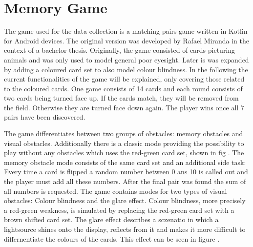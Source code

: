 \chapter{Memory Game}
\label{memory_game}


The game used for the data collection is a matching pairs game written in Kotlin for Android devices. The original version was developed by Rafael Miranda  in the context of a bachelor thesis. Originally, the game consisted of cards picturing animals and was only used to model general poor eyesight. Later is was expanded by adding a coloured card set to also model colour blindness. In the following the current functionalities of the game will be explained, only covering those related to the coloured cards. One game consists of 14 cards and each round consists of two cards being turned face up. If the cards match, they will be removed from the field. Otherwise they are turned face down again. The player wins once all 7 pairs have been discovered. 

The game differentiates between two groups of obstacles: memory obstacles and visual obstacles. Additionally there is a classic mode providing the possibility to play without any obstacles which uses the red-green card set, shown in fig . The memory obstacle mode consists of the same card set and an additional side task: Every time a card is flipped a random number between 0 ans 10 is called out and the player must add all these numbers. After the final pair was found the sum of all numbers is requested. The game contains modes for two types of visual obstacles: Colour blindness and the glare effect. Colour blindness, more precisely a red-green weakness, is simulated by replacing the red-green card set with a brown shifted card set. The glare effect describes a sczenatio in which a lightsource shines onto the display, reflects from it and makes it more difficult to differnentiate the colours of the cards. This effect can be seen in figure . 

